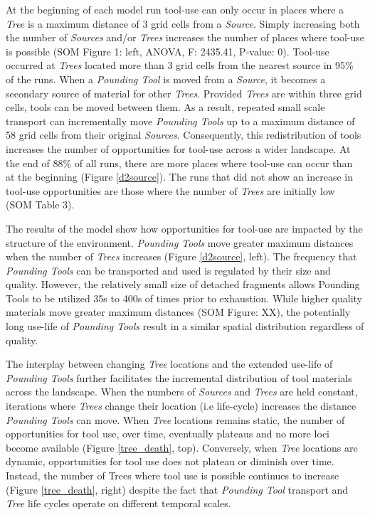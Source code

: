 \documentclass[9pt,twocolumn,twoside,]{pnas-new}
\begin{document}
At the beginning of each model run tool-use can only occur in places
where a \emph{Tree} is a maximum distance of 3 grid cells from a
\emph{Source}. Simply increasing both the number of \emph{Sources}
and/or \emph{Trees} increases the number of places where tool-use is
possible (SOM Figure 1: left, ANOVA, F: 2435.41, P-value: 0). Tool-use
occurred at \emph{Trees} located more than 3 grid cells from the nearest
source in 95\% of the runs. When a \emph{Pounding Tool} is moved from a
\emph{Source}, it becomes a secondary source of material for other
\emph{Trees}. Provided \emph{Trees} are within three grid cells, tools
can be moved between them. As a result, repeated small scale transport
can incrementally move \emph{Pounding Tools} up to a maximum distance of
58 grid cells from their original \emph{Sources}. Consequently, this
redistribution of tools increases the number of opportunities for
tool-use across a wider landscape. At the end of 88\% of all runs, there
are more places where tool-use can occur than at the beginning (Figure
\ref{d2source}). The runs that did not show an increase in tool-use
opportunities are those where the number of \emph{Trees} are initially
low (SOM Table 3).

The results of the model show how opportunities for tool-use are
impacted by the structure of the environment. \emph{Pounding Tools} move
greater maximum distances when the number of \emph{Trees} increases
(Figure \ref{d2source}, left). The frequency that \emph{Pounding Tools}
can be transported and used is regulated by their size and quality.
However, the relatively small size of detached fragments allows Pounding
Tools to be utilized 35s to 400s of times prior to exhaustion. While
higher quality materials move greater maximum distances (SOM Figure:
XX), the potentially long use-life of \emph{Pounding Tools} result in a
similar spatial distribution regardless of quality.

The interplay between changing \emph{Tree} locations and the extended
use-life of \emph{Pounding Tools} further facilitates the incremental
distribution of tool materials across the landscape. When the numbers of
\emph{Sources} and \emph{Trees} are held constant, iterations where
\emph{Trees} change their location (i.e life-cycle) increases the
distance \emph{Pounding Tools} can move. When \emph{Tree} locations
remains static, the number of opportunities for tool use, over time,
eventually plateaus and no more loci become available (Figure
\ref{tree_death}, top). Conversely, when \emph{Tree} locations are
dynamic, opportunities for tool use does not plateau or diminish over
time. Instead, the number of Trees where tool use is possible continues
to increase (Figure \ref{tree_death}, right) despite the fact that
\emph{Pounding Tool} transport and \emph{Tree} life cycles operate on
different temporal scales.
\end{document}
